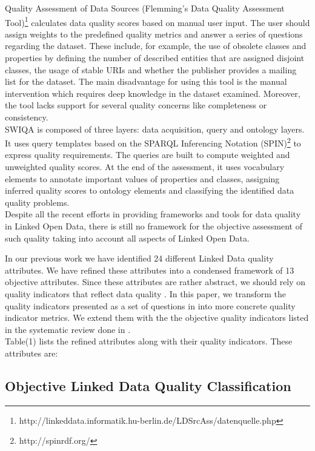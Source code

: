 \documentclass[onecolumn, crcready]{iosart2c}
\begin{document}
Quality Assessment of Data Sources (Flemming's Data Quality Assessment Tool)\footnote{http://linkeddata.informatik.hu-berlin.de/LDSrcAss/datenquelle.php} calculates data quality scores based on manual user input. The user should assign weights to the predefined quality metrics and answer a series of questions regarding the dataset. These include, for example, the use of obsolete classes and properties by defining the number of described entities that are assigned disjoint classes, the usage of stable URIs and whether the publisher provides a mailing list for the dataset. The main disadvantage for using this tool is the manual intervention which requires deep knowledge in the dataset examined. Moreover, the tool lacks support for several quality concerns like completeness or consistency.\\


SWIQA \cite{Furber2011a} is composed of three layers: data acquisition, query and ontology layers. It uses query templates based on the SPARQL Inferencing Notation (SPIN)\footnote{http://spinrdf.org/} to express quality requirements. The queries are built to compute weighted and unweighted quality scores. At the end of the assessment, it uses vocabulary elements to annotate important values of properties and classes, assigning inferred quality scores to ontology elements and classifying the identified data quality problems.\\

Despite all the recent efforts in providing frameworks and tools for data quality in Linked Open Data, there is still no framework for the objective assessment of such quality taking into account all aspects of Linked Open Data.

In our previous work \cite{assaf2012} we have identified 24 different Linked Data quality attributes. We have refined these attributes into a condensed framework of 13 objective attributes. Since these attributes are rather abstract, we should rely on quality indicators that reflect data quality \cite{flemming2010}. In this paper, we transform the quality indicators presented as a set of questions in \cite{assaf2012} into more concrete quality indicator metrics. We extend them with the the objective quality indicators listed in the systematic review done in \cite{Framework2012}.\\

Table(1) lists the refined attributes along with their quality indicators. These attributes are:

\subsection{Objective Linked Data Quality Classification}
\end{document}
